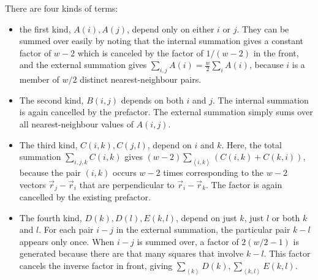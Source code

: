 \documentclass[10pt]{report}
\numberwithin{equation}{section}
\begin{document}
There are four kinds of terms:
\begin{itemize}
	\item the first kind, \(A(i), A(j)\), depend only on either \(i\) or \(j\). They can be summed over easily by noting that the internal summation gives a constant factor of \(w-2\) which is canceled by the factor of \(1/(w-2)\) in the front, and the external summation gives \(\sum_{i,j}A(i) = \frac{w}{2} \sum_i A(i)\), because \(i\) is a member of \(w/2\) distinct nearest-neighbour pairs. 
	\item The second kind, \(B(i,j)\) depends on both \(i\) and \(j\). The internal summation is again cancelled by the prefactor. The external summation simply sums over all nearest-neighbour values of \(A(i,j)\).
	\item The third kind, \(C(i,k), C(j,l)\), depend on \(i\) and \(k\). Here, the total summation \(\sum_{i,j,k}C(i,k)\) gives \((w-2)\sum_{\left<i,k\right>}\left(C(i,k) + C(k,i)\right)\), because the pair \((i,k)\) occurs \(w-2\) times corresponding to the \(w-2\) vectors \(\vec r_j - \vec r_i\) that are perpendicular to \(\vec r_i - \vec r_k\). The factor is again cancelled by the existing prefactor. 
	\item The fourth kind, \(D(k), D(l), E(k,l)\), depend on just \(k\), just \(l\) or both \(k\) and \(l\). For each pair \(i-j\) in the external summation, the particular pair \(k-l\) appears only once. When \(i-j\) is summed over, a factor of \(2(w/2-1)\) is generated because there are that many squares that involve \(k-l\). This factor cancels the inverse factor in front, giving \(\sum_{\left<k\right>} D(k), \sum_{\left<k,l \right>}E(k,l)\).
\end{itemize}
\end{document}
